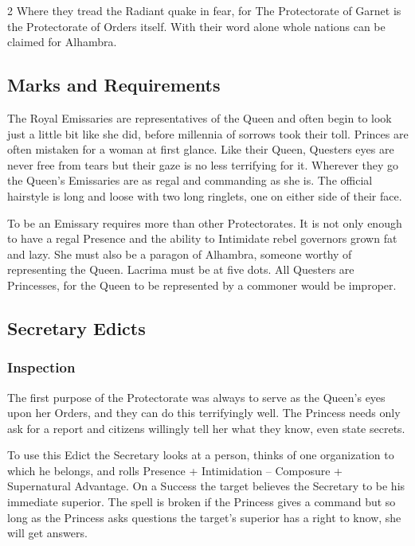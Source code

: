 \begin{multicols}{2}
Where they tread the Radiant quake in fear, for The Protectorate of Garnet is the Protectorate of Orders itself. With their word alone whole nations can be claimed for Alhambra. 

\subsection*{Marks and Requirements}

The Royal Emissaries are representatives of the Queen and often begin to look just a little bit like she did, before millennia of sorrows took their toll. Princes are often mistaken for a woman at first glance. Like their Queen, Questers eyes are never free from tears but their gaze is no less terrifying for it. Wherever they go the Queen's Emissaries are as regal and commanding as she is. The official hairstyle is long and loose with two long ringlets, one on either side of their face. 

To be an Emissary requires more than other Protectorates. It is not only enough to have a regal Presence and the ability to Intimidate rebel governors grown fat and lazy. She must also be a paragon of Alhambra, someone worthy of representing the Queen. Lacrima must be at five dots. All Questers are Princesses, for the Queen to be represented by a commoner would be improper. 

\subsection*{Secretary Edicts}

\subsubsection*{Inspection}

The first purpose of the Protectorate was always to serve as the Queen's eyes upon her Orders, and they can do this terrifyingly well. The Princess needs only ask for a report and citizens willingly tell her what they know, even state secrets. 

To use this Edict the Secretary looks at a person, thinks of one organization to which he belongs, and rolls Presence + Intimidation – Composure + Supernatural Advantage. On a Success the target believes the Secretary to be his immediate superior. The spell is broken if the Princess gives a command but so long as the Princess asks questions the target's superior has a right to know, she will get answers. 


\end{multicols}
